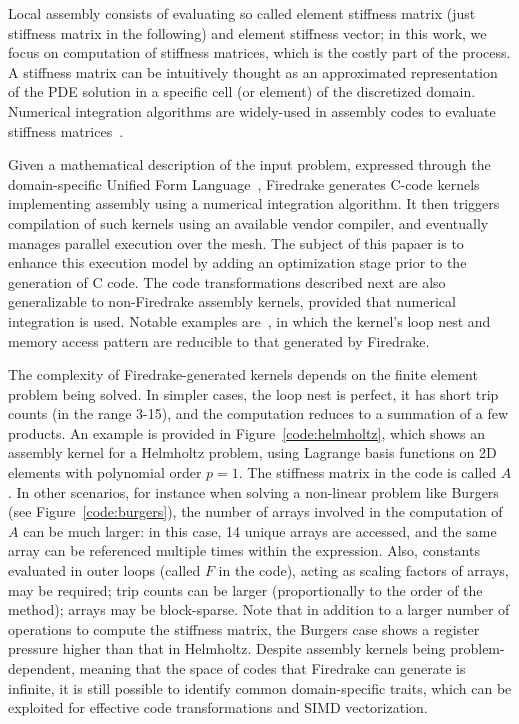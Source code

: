 \documentclass[conference]{IEEEtran}
\begin{document}
Local assembly consists of evaluating so called element stiffness matrix (just stiffness matrix in the following) and element stiffness vector; in this work, we focus on computation of stiffness matrices, which is the costly part of the process. A stiffness matrix can be intuitively thought as an approximated representation of the PDE solution in a specific cell (or element) of the discretized domain. Numerical integration algorithms are widely-used in assembly codes to evaluate stiffness matrices~\cite{quadrature1, quadrature2}. 

Given a mathematical description of the input problem, expressed through the domain-specific Unified Form Language~\cite{ufl}, Firedrake generates C-code kernels implementing assembly using a numerical integration algorithm. It then triggers compilation of such kernels using an available vendor compiler, and eventually manages parallel execution over the mesh. The subject of this papaer is to enhance this execution model by adding an optimization stage prior to the generation of C code. The code transformations described next are also generalizable to non-Firedrake assembly kernels, provided that numerical integration is used. Notable examples are~\cite{uflacs, fluidity, mcfc}, in which the kernel's loop nest and memory access pattern are reducible to that generated by Firedrake.

The complexity of Firedrake-generated kernels depends on the finite element problem being solved. In simpler cases, the loop nest is perfect, it has short trip counts (in the range 3-15), and the computation reduces to a summation of a few products. An example is provided in Figure~\ref{code:helmholtz}, which shows an assembly kernel for a Helmholtz problem, using Lagrange basis functions on 2D elements with polynomial order $p=1$. The stiffness matrix in the code is called $A$. In other scenarios, for instance when solving a non-linear problem like Burgers (see Figure~\ref{code:burgers}), the number of arrays involved in the computation of $A$ can be much larger: in this case, 14 unique arrays are accessed, and the same array can be referenced multiple times within the expression. Also, constants evaluated in outer loops (called $F$ in the code), acting as scaling factors of arrays, may be required; trip counts can be larger (proportionally to the order of the method); arrays may be block-sparse. Note that in addition to a larger number of operations to compute the stiffness matrix, the Burgers case shows a register pressure higher than that in Helmholtz. Despite assembly kernels being problem-dependent, meaning that the space of codes that Firedrake can generate is infinite, it is still possible to identify common domain-specific traits, which can be exploited for effective code transformations and SIMD vectorization.
\end{document}
